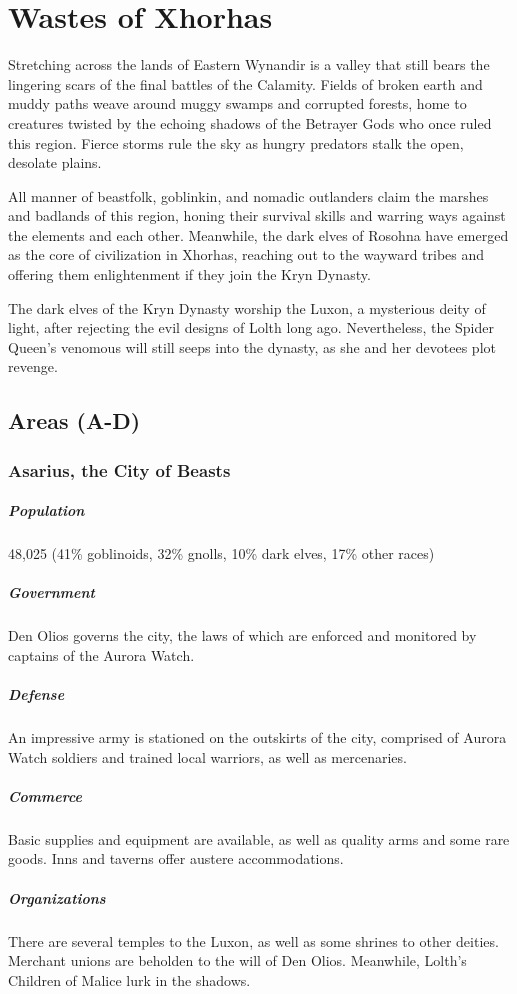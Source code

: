 \documentclass[10pt,a4paper,twoside,bg=print,twocolumn,openany,nodeprecatedcode]{dndbook}
\begin{document}
\section{Wastes of Xhorhas}
Stretching across the lands of Eastern Wynandir is a valley that still bears the lingering scars of the final battles of the Calamity. Fields of broken earth and muddy paths weave around muggy swamps and corrupted forests, home to creatures twisted by the echoing shadows of the Betrayer Gods who once ruled this region. Fierce storms rule the sky as hungry predators stalk the open, desolate plains.

All manner of beastfolk, goblinkin, and nomadic outlanders claim the marshes and badlands of this region, honing their survival skills and warring ways against the elements and each other. Meanwhile, the dark elves of Rosohna have emerged as the core of civilization in Xhorhas, reaching out to the wayward tribes and offering them enlightenment if they join the Kryn Dynasty.

The dark elves of the Kryn Dynasty worship the Luxon, a mysterious deity of light, after rejecting the evil designs of Lolth long ago. Nevertheless, the Spider Queen's venomous will still seeps into the dynasty, as she and her devotees plot revenge.

\subsection{Areas (A-D)}
\subsubsection{Asarius, the City of Beasts}
\subparagraph{Population}
48,025 (41\% goblinoids, 32\% gnolls, 10\% dark elves, 17\% other races)

\subparagraph{Government}
Den Olios governs the city, the laws of which are enforced and monitored by captains of the Aurora Watch.

\subparagraph{Defense}
An impressive army is stationed on the outskirts of the city, comprised of Aurora Watch soldiers and trained local warriors, as well as mercenaries.

\subparagraph{Commerce}
Basic supplies and equipment are available, as well as quality arms and some rare goods. Inns and taverns offer austere accommodations.

\subparagraph{Organizations}
There are several temples to the Luxon, as well as some shrines to other deities. Merchant unions are beholden to the will of Den Olios. Meanwhile, Lolth's Children of Malice lurk in the shadows.
\end{document}
